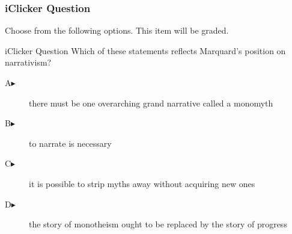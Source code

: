 \begin{frame}
  \frametitle{iClicker Question}
Choose from the following options. This item will be graded.
\begin{block}{iClicker Question}
Which of these statements reflects Marquard's position on narrativism?
\end{block}
\begin{description}
\item[A\hspace{.2in}$\blacktriangleright$] there must be one
  overarching grand narrative called a monomyth
\item[B\hspace{.2in}$\blacktriangleright$] to narrate is necessary
\item[C\hspace{.2in}$\blacktriangleright$] it is possible to strip
  myths away without acquiring new ones
\item[D\hspace{.2in}$\blacktriangleright$] the story of monotheism
  ought to be replaced by the story of progress
\end{description}
\end{frame}
